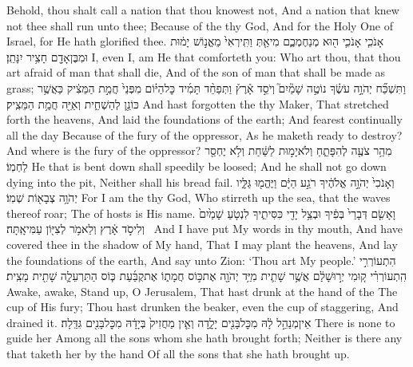 {Behold, thou shalt call a nation that thou knowest not, And a nation that knew not thee shall run unto thee; Because of the \lord\space thy God, And for the Holy One of Israel, for He hath glorified thee.}
\newperek
{}
\label{haft_48}
\setcounter{chap}{51}
\setcounter{verse}{12}
{אָנֹכִ֧י אָנֹכִ֛י ה֖וּא מְנַחֶמְכֶ֑ם מִי\maqqaf אַ֤תְּ וַתִּֽירְאִי֙ מֵאֱנ֣וֹשׁ יָמ֔וּת וּמִבֶּן\maqqaf אָדָ֖ם חָצִ֥יר יִנָּתֵֽן׃}
{I, even I, am He that comforteth you: Who art thou, that thou art afraid of man that shall die, And of the son of man that shall be made as grass;}
{וַתִּשְׁכַּ֞ח יְהֹוָ֣ה עֹשֶׂ֗ךָ נוֹטֶ֣ה שָׁמַ֘יִם֮ וְיֹסֵ֣ד אָ֒רֶץ֒ וַתְּפַחֵ֨ד תָּמִ֜יד כׇּל\maqqaf הַיּ֗וֹם מִפְּנֵי֙ חֲמַ֣ת הַמֵּצִ֔יק כַּאֲשֶׁ֥ר כּוֹנֵ֖ן לְהַשְׁחִ֑ית וְאַיֵּ֖ה חֲמַ֥ת הַמֵּצִֽיק׃}
{And hast forgotten the \lord\space thy Maker, That stretched forth the heavens, And laid the foundations of the earth; And fearest continually all the day Because of the fury of the oppressor, As he maketh ready to destroy? And where is the fury of the oppressor?}
{מִהַ֥ר צֹעֶ֖ה לְהִפָּתֵ֑חַ וְלֹא\maqqaf יָמ֣וּת לַשַּׁ֔חַת וְלֹ֥א יֶחְסַ֖ר לַחְמֽוֹ׃}
{He that is bent down shall speedily be loosed; And he shall not go down dying into the pit, Neither shall his bread fail.}
{וְאָנֹכִי֙ יְהֹוָ֣ה אֱלֹהֶ֔יךָ רֹגַ֣ע הַיָּ֔ם וַיֶּהֱמ֖וּ גַּלָּ֑יו יְהֹוָ֥ה צְבָא֖וֹת שְׁמֽוֹ׃}
{For I am the \lord\space thy God, Who stirreth up the sea, that the waves thereof roar; The \lord\space of hosts is His name.}
{וָאָשִׂ֤ם דְּבָרַי֙ בְּפִ֔יךָ וּבְצֵ֥ל יָדִ֖י כִּסִּיתִ֑יךָ לִנְטֹ֤עַ שָׁמַ֙יִם֙ וְלִיסֹ֣ד אָ֔רֶץ וְלֵאמֹ֥ר לְצִיּ֖וֹן עַמִּי\maqqaf אָֽתָּה׃ \setuma }
{And I have put My words in thy mouth, And have covered thee in the shadow of My hand, That I may plant the heavens, And lay the foundations of the earth, And say unto Zion: ‘Thou art My people.’}
{הִתְעוֹרְרִ֣י הִֽתְעוֹרְרִ֗י ק֚וּמִי יְר֣וּשָׁלַ֔͏ִם אֲשֶׁ֥ר שָׁתִ֛ית מִיַּ֥ד יְהֹוָ֖ה אֶת\maqqaf כּ֣וֹס חֲמָת֑וֹ אֶת\maqqaf קֻבַּ֜עַת כּ֧וֹס הַתַּרְעֵלָ֛ה שָׁתִ֖ית מָצִֽית׃}
{Awake, awake, Stand up, O Jerusalem, That hast drunk at the hand of the \lord\space The cup of His fury; Thou hast drunken the beaker, even the cup of staggering, And drained it.}
{אֵין\maqqaf מְנַהֵ֣ל לָ֔הּ מִכׇּל\maqqaf בָּנִ֖ים יָלָ֑דָה וְאֵ֤ין מַחֲזִיק֙ בְּיָדָ֔הּ מִכׇּל\maqqaf בָּנִ֖ים גִּדֵּֽלָה׃}
{There is none to guide her Among all the sons whom she hath brought forth; Neither is there any that taketh her by the hand Of all the sons that she hath brought up.}

